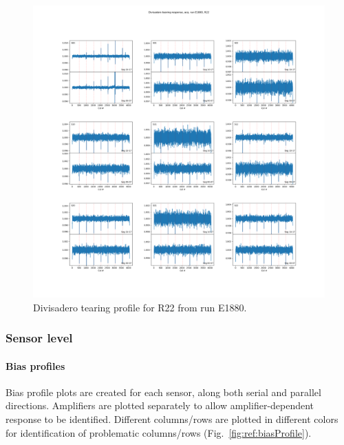 \begin{figure}
    \centering
    \includegraphics[width=0.8\linewidth]{figures/ReferenceFigures/divisadero_raft_plot_LSSTCam_R22_S00_u_lsstccs_eo_divisadero_tearing_E1880_w_2024_35_20241101T020421Z.png}
    \caption{Divisadero tearing profile for R22 from run E1880.}
    \label{fig:ref:divisaderoProfile}
\end{figure}
\clearpage
\subsubsection{Sensor level}

\paragraph{Bias profiles}

Bias profile plots are created for each sensor, along both serial and parallel directions. Amplifiers are plotted separately to allow amplifier-dependent response to be identified. Different columns/rows are plotted in different colors for identification of problematic columns/rows (Fig.~\ref{fig:ref:biasProfile}).

